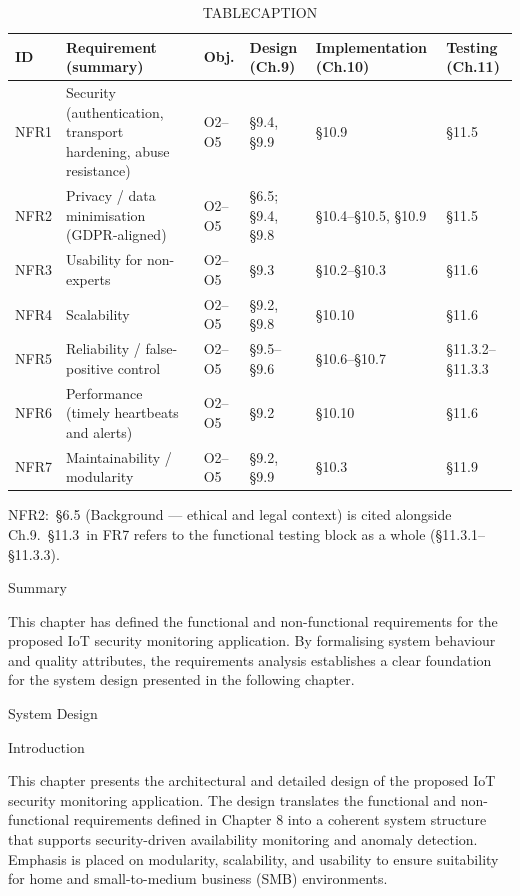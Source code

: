 \begin{table}[htbp]
  \centering
  \small
  \caption{TABLECAPTION}
  \label{tab:ICA1PLACEHOLDER}
\begin{tabular}{p{}p{}p{}p{}p{}p{}}
\toprule
ID & Requirement (summary) & Obj. & Design (Ch.9) & Implementation (Ch.10) & Testing (Ch.11) \\
\midrule
NFR1 & Security (authentication, transport hardening, abuse resistance) & O2--O5 & \S{}9.4, \S{}9.9 & \S{}10.9 & \S{}11.5 \\
\midrule
NFR2 & Privacy / data minimisation (GDPR-aligned) & O2--O5 & \S{}6.5; \S{}9.4, \S{}9.8 & \S{}10.4--\S{}10.5, \S{}10.9 & \S{}11.5 \\
\midrule
NFR3 & Usability for non-experts & O2--O5 & \S{}9.3 & \S{}10.2--\S{}10.3 & \S{}11.6 \\
\midrule
NFR4 & Scalability & O2--O5 & \S{}9.2, \S{}9.8 & \S{}10.10 & \S{}11.6 \\
\midrule
NFR5 & Reliability / false-positive control & O2--O5 & \S{}9.5--\S{}9.6 & \S{}10.6--\S{}10.7 & \S{}11.3.2--\S{}11.3.3 \\
\midrule
NFR6 & Performance (timely heartbeats and alerts) & O2--O5 & \S{}9.2 & \S{}10.10 & \S{}11.6 \\
\midrule
NFR7 & Maintainability / modularity & O2--O5 & \S{}9.2, \S{}9.9 & \S{}10.3 & \S{}11.9 \\
\bottomrule
\end{tabular}
\end{table}

NFR2:~\S{}6.5 (Background --- ethical and legal context) is cited alongside Ch.9.~\S{}11.3~in FR7 refers to the functional testing block as a whole (\S{}11.3.1--\S{}11.3.3).

Summary

This chapter has defined the functional and non-functional requirements for the proposed IoT security monitoring application. By formalising system behaviour and quality attributes, the requirements analysis establishes a clear foundation for the system design presented in the following chapter. 

System Design

Introduction

This chapter presents the architectural and detailed design of the proposed IoT security monitoring application. The design translates the functional and non-functional requirements defined in Chapter 8 into a coherent system structure that supports security-driven availability monitoring and anomaly detection. Emphasis is placed on modularity, scalability, and usability to ensure suitability for home and small-to-medium business (SMB) environments.

